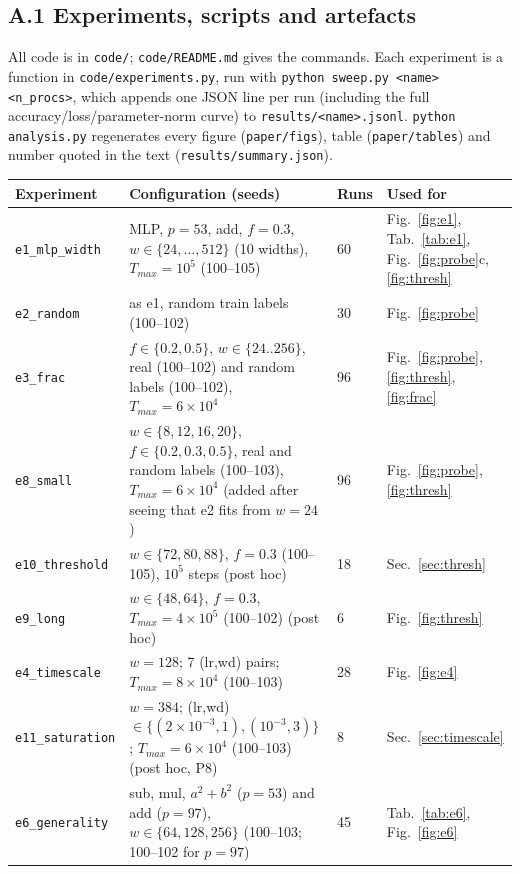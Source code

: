 \subsection*{A.1 Experiments, scripts and artefacts}
All code is in \texttt{code/}; \texttt{code/README.md} gives the commands. Each experiment is a function in \texttt{code/experiments.py}, run with \texttt{python sweep.py <name> <n\_procs>}, which appends one JSON line per run (including the full accuracy/loss/parameter-norm curve) to \texttt{results/<name>.jsonl}.
\texttt{python analysis.py} regenerates every figure (\texttt{paper/figs}), table (\texttt{paper/tables}) and number quoted in the text (\texttt{results/summary.json}).
\begin{center}\scriptsize
\begin{tabular}{p{2.3cm}p{5.8cm}p{1.1cm}p{3.2cm}}\toprule
Experiment & Configuration (seeds) & Runs & Used for\\\midrule
\texttt{e1\_mlp\_width} & MLP, $p{=}53$, add, $f{=}0.3$, $w\in\{24,\dots,512\}$ (10 widths), $T_{max}{=}10^5$ (100--105) & 60 & Fig.~\ref{fig:e1}, Tab.~\ref{tab:e1}, Fig.~\ref{fig:probe}c, \ref{fig:thresh}\\
\texttt{e2\_random} & as e1, random train labels (100--102) & 30 & Fig.~\ref{fig:probe}\\
\texttt{e3\_frac} & $f\in\{0.2,0.5\}$, $w\in\{24..256\}$, real (100--102) and random labels (100--102), $T_{max}{=}6\!\times\!10^4$ & 96 & Fig.~\ref{fig:probe}, \ref{fig:thresh}, \ref{fig:frac}\\
\texttt{e8\_small} & $w\in\{8,12,16,20\}$, $f\in\{0.2,0.3,0.5\}$, real and random labels (100--103), $T_{max}{=}6\!\times\!10^4$ (added after seeing that e2 fits from $w{=}24$) & 96 & Fig.~\ref{fig:probe}, \ref{fig:thresh}\\
\texttt{e10\_threshold} & $w\in\{72,80,88\}$, $f{=}0.3$ (100--105), $10^5$ steps (post hoc) & 18 & Sec.~\ref{sec:thresh}\\
\texttt{e9\_long} & $w\in\{48,64\}$, $f{=}0.3$, $T_{max}{=}4\!\times\!10^5$ (100--102) (post hoc) & 6 & Fig.~\ref{fig:thresh}\\
\texttt{e4\_timescale} & $w{=}128$; 7 (lr,wd) pairs; $T_{max}{=}8\!\times\!10^4$ (100--103) & 28 & Fig.~\ref{fig:e4}\\
\texttt{e11\_saturation} & $w{=}384$; (lr,wd)$\in\{(2\!\times\!10^{-3},1),(10^{-3},3)\}$; $T_{max}{=}6\!\times\!10^4$ (100--103) (post hoc, P8) & 8 & Sec.~\ref{sec:timescale}\\
\texttt{e6\_generality} & sub, mul, $a^2{+}b^2$ ($p{=}53$) and add ($p{=}97$), $w\in\{64,128,256\}$ (100--103; 100--102 for $p{=}97$) & 45 & Tab.~\ref{tab:e6}, Fig.~\ref{fig:e6}\\

\end{tabular}
\end{center}

